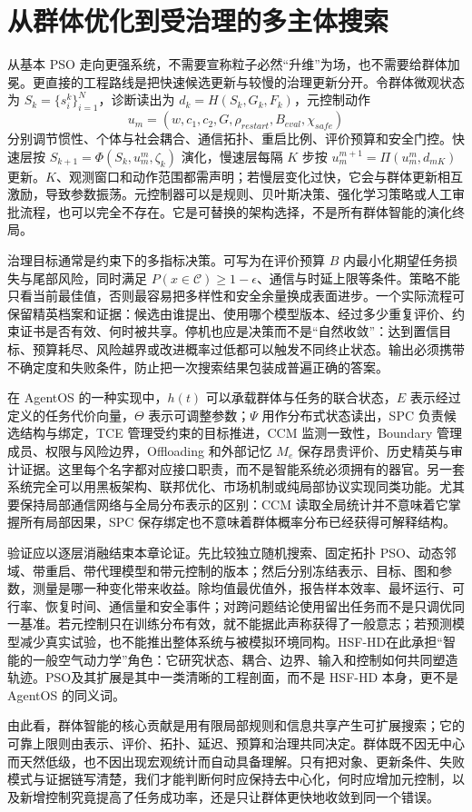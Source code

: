 \section{从群体优化到受治理的多主体搜索}
\label{sec:section_4730}

从基本 PSO 走向更强系统，不需要宣称粒子必然“升维”为场，也不需要给群体加冕。更直接的工程路线是把快速候选更新与较慢的治理更新分开。令群体微观状态为 $S_k=\{s_i^k\}_{i=1}^{N}$，诊断读出为 $d_k=H(S_k,G_k,F_k)$，元控制动作
\[
u_m=(w,c_1,c_2,G,\rho_{restart},B_{eval},\chi_{safe})
\]
分别调节惯性、个体与社会耦合、通信拓扑、重启比例、评价预算和安全门控。快速层按 $S_{k+1}=\Phi(S_k,u_m^m,\zeta_k)$ 演化，慢速层每隔 $K$ 步按 $u_m^{m+1}=\Pi(u_m^m,d_{mK})$ 更新。$K$、观测窗口和动作范围都需声明；若慢层变化过快，它会与群体更新相互激励，导致参数振荡。元控制器可以是规则、贝叶斯决策、强化学习策略或人工审批流程，也可以完全不存在。它是可替换的架构选择，不是所有群体智能的演化终局。

治理目标通常是约束下的多指标决策。可写为在评价预算 $B$ 内最小化期望任务损失与尾部风险，同时满足 $P(x\in\mathcal{C})\ge 1-\epsilon$、通信与时延上限等条件。策略不能只看当前最佳值，否则最容易把多样性和安全余量换成表面进步。一个实际流程可保留精英档案和证据：候选由谁提出、使用哪个模型版本、经过多少重复评价、约束证书是否有效、何时被共享。停机也应是决策而不是“自然收敛”：达到置信目标、预算耗尽、风险越界或改进概率过低都可以触发不同终止状态。输出必须携带不确定度和失败条件，防止把一次搜索结果包装成普遍正确的答案。

在 AgentOS 的一种实现中，$h(t)$ 可以承载群体与任务的联合状态，$E$ 表示经过定义的任务代价向量，$\Theta$ 表示可调整参数；$\Psi$ 用作分布式状态读出，SPC 负责候选结构与绑定，TCE 管理受约束的目标推进，CCM 监测一致性，Boundary 管理成员、权限与风险边界，Offloading 和外部记忆 $M_e$ 保存昂贵评价、历史精英与审计证据。这里每个名字都对应接口职责，而不是智能系统必须拥有的器官。另一套系统完全可以用黑板架构、联邦优化、市场机制或纯局部协议实现同类功能。尤其要保持局部通信网络与全局分布表示的区别：CCM 读取全局统计并不意味着它掌握所有局部因果，SPC 保存绑定也不意味着群体概率分布已经获得可解释结构。

验证应以逐层消融结束本章论证。先比较独立随机搜索、固定拓扑 PSO、动态邻域、带重启、带代理模型和带元控制的版本；然后分别冻结表示、目标、图和参数，测量是哪一种变化带来收益。除均值最优值外，报告样本效率、最坏运行、可行率、恢复时间、通信量和安全事件；对跨问题结论使用留出任务而不是只调优同一基准。若元控制只在训练分布有效，就不能据此声称获得了一般意志；若预测模型减少真实试验，也不能推出整体系统与被模拟环境同构。HSF-HD在此承担“智能的一般空气动力学”角色：它研究状态、耦合、边界、输入和控制如何共同塑造轨迹。PSO及其扩展是其中一类清晰的工程剖面，而不是 HSF-HD 本身，更不是 AgentOS 的同义词。

由此看，群体智能的核心贡献是用有限局部规则和信息共享产生可扩展搜索；它的可靠上限则由表示、评价、拓扑、延迟、预算和治理共同决定。群体既不因无中心而天然低级，也不因出现宏观统计而自动具备理解。只有把对象、更新条件、失败模式与证据链写清楚，我们才能判断何时应保持去中心化，何时应增加元控制，以及新增控制究竟提高了任务成功率，还是只让群体更快地收敛到同一个错误。
